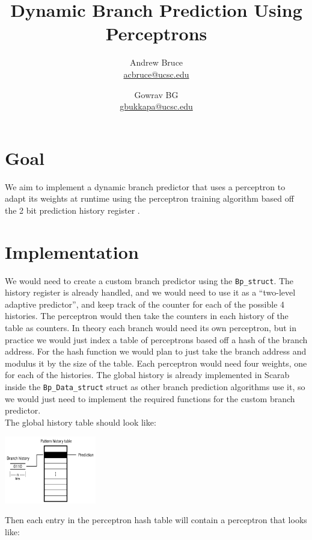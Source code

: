 \documentclass{article}
\title{Dynamic Branch Prediction Using Perceptrons}
\author{Andrew Bruce \\ \href{mailto:acbruce@ucsc.edu}{acbruce@ucsc.edu}
  \and Gowrav BG \\ \href{mailto:gbukkapa@ucsc.edu}{gbukkapa@ucsc.edu} }
\begin{document}
\maketitle
{}
\section*{Goal}
\indent We aim to implement a dynamic branch predictor that uses a perceptron to adapt its weights at runtime using the perceptron training algorithm based off the 2 bit prediction history register \cite{article}.
\section*{Implementation}
\indent We would need to create a custom branch predictor using the \verb=Bp_struct=. The history register is already handled, and we would need to use it as a ``two-level adaptive predictor'', and keep track of the counter for each of the possible 4 histories. The perceptron would then take the counters in each history of the table as counters. In theory each branch would need its own perceptron, but in practice we would just index a table of perceptrons based off a hash of the branch address. For the hash function we would plan to just take the branch address and modulus it by the size of the table. Each perceptron would need four weights, one for each of the histories. The global history is already implemented in Scarab inside the \verb=Bp_Data_struct= struct as other branch prediction algorithms use it, so we would just need to implement the required functions for the custom branch predictor.\\
\indent The global history table should look like:
\begin{center}
  \includegraphics[width=0.3\textwidth]{table.png}
\end{center}
\indent Then each entry in the perceptron hash table will contain a perceptron that looks like:
\begin{center}
\end{center}
\end{document}
